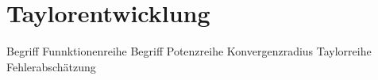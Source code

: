 \chapter{Taylorentwicklung}

Begriff Funnktionenreihe
Begriff Potenzreihe
Konvergenzradius
Taylorreihe
Fehlerabschätzung
